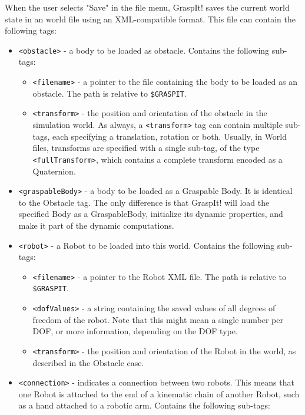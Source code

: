 When the user selects "Save" in the file menu, GraspIt! saves the
current world state in an world file using an XML-compatible
format. This file can contain the following tags:
\begin{itemize}
\item \texttt{<obstacle>} - a body to be loaded as obstacle. Contains the
  following sub-tags:
  \begin{itemize}
  \item \texttt{<filename>} - a pointer to the file containing the body to be
    loaded as an obstacle. The path is relative to \texttt{\$GRASPIT}.
  \item \texttt{<transform>} - the position and orientation of the obstacle in
    the simulation world. As always, a \texttt{<transform>} tag can contain
    multiple sub-tags, each specifying a translation, rotation or
    both. Usually, in World files, transforms are specified with a
    single sub-tag, of the type \texttt{<fullTransform>}, which contains a
    complete transform encoded as a Quaternion.
  \end{itemize}
\item\texttt{<graspableBody>} - a body to be loaded as a Graspable Body. It is
  identical to the Obstacle tag. The only difference is that GraspIt!
  will load the specified Body as a GraspableBody, initialize its
  dynamic properties, and make it part of the dynamic computations.
\item\texttt{<robot>} - a Robot to be loaded into this world. Contains the
  following sub-tags:
  \begin{itemize}
  \item \texttt{<filename>} - a pointer to the Robot XML file. The path is
    relative to \texttt{\$GRASPIT}.
  \item \texttt{<dofValues>} - a string containing the saved values of all
    degrees of freedom of the robot. Note that this might mean a
    single number per DOF, or more information, depending on the DOF
    type.
  \item \texttt{<transform>} - the position and orientation of the Robot in the
    world, as described in the Obstacle case.
  \end{itemize}
\item \texttt{<connection>} - indicates a connection between two robots. This
  means that one Robot is attached to the end of a kinematic chain of
  another Robot, such as a hand attached to a robotic arm. Contains
  the following sub-tags:
  \begin{itemize}

\end{itemize}
\end{itemize}
